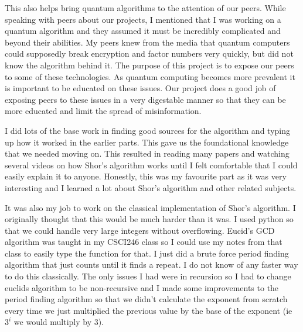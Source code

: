 \documentclass[a4paper]{article}
\begin{document}
This also helps bring quantum algorithms to the attention of our peers. While speaking with peers about our projects,
I mentioned that I was working on a quantum algorithm and they assumed it must be incredibly complicated and beyond their abilities.
My peers knew from the media that quantum computers could supposedly break encryption and factor numbers very quickly,
but did not know the algorithm behind it. The purpose of this project is to expose our peers to some of these technologies.
As quantum computing becomes more prevalent it is important to be educated on these issues.
Our project does a good job of exposing peers to these issues in a very digestable manner so that they can be more educated and limit the spread of  misinformation.

I did lots of the base work in finding good sources for the algorithm and typing up how it worked in the earlier parts.
This gave us the foundational knowledge that we needed moving on. This resulted in reading many papers and watching several videos on how Shor's algorithm works until I felt comfortable that I could easily explain it to anyone.
Honestly, this was my favourite part as it was very interesting and I learned a lot about Shor's algorithm and other related subjects.

It was also my job to work on the classical implementation of Shor's algorithm. I originally thought that this would be much harder than it was.
I used python so that we could handle very large integers without overflowing. Eucid's GCD algorithm was taught in my CSCI246 class so I could use my notes from that class to easily type the function for that.
I just did a brute force  period finding algorithm that just counts until it finds a repeat.
I do not know of any faster way to do this classically. The only issues I had were in recursion so I had to change euclids algorithm to be non-recursive and I made some improvements to the period finding algorithm so that we didn't calculate the exponent from scratch every time we just multiplied the previous value by the base of the exponent (ie $3^i$ we would multiply by 3).
\end{document}
